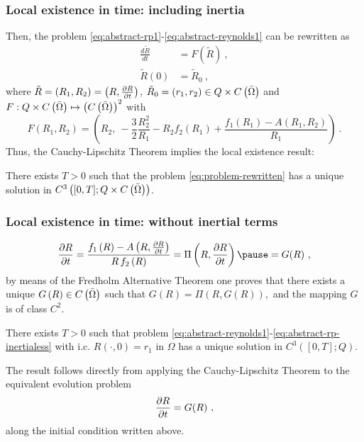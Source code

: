 \documentclass[10pt,aspectratio=169]{beamer}
\begin{document}
\begin{frame}\frametitle{Local existence in time: including inertia}
Then, the problem \eqref{eq:abstract-rp1}-\eqref{eq:abstract-reynolds1} can be rewritten as
\begin{equation}
\begin{split}
\frac{d\tilde{R}}{dt}&=F(\tilde{R})~,\\
\tilde{R}(0)&=\tilde{R}_0~,
\end{split}\label{eq:problem-rewritten}
\end{equation}
where $\tilde{R}=\left(R_1,R_2\right)=\left(R,\frac{\partial R}{\partial t}\right)$, $\tilde{R}_0=(r_1,r_2)\in Q\times C\left(\bar{\Omega}\right)$ and $F:Q\times C\left(\bar{\Omega}\right)\mapsto \left(C\left(\bar{\Omega}\right)\right)^2$ with
\begin{equation}
F(R_1,R_2)=\left(
R_2,~-\frac{3}{2}\frac{R_2^2}{R_1}-R_2f_2\left(R_1\right)+\frac{f_1\left(R_1\right)-A\left(R_1,R_2\right)}{R_1}\right)~.
\end{equation}
Thus, the Cauchy-Lipschitz Theorem implies the local existence result:
\begin{theorem}There exists $T>0$ such that the  problem \eqref{eq:problem-rewritten} has a unique solution in $C^3\left([0,T];Q\times C\left(\bar{\Omega}\right)\right)$.
\end{theorem}
\end{frame}

\begin{frame}
\frametitle{Local existence in time: without inertial terms}
\vspace*{0.6cm}
\begin{equation}
\parder{R}{t}=\frac{f_1\left(R\right)-A\left(R,\parder{R}{t}\right)}{R\,f_2\left(R\right)}=\Pi\left(R,\parder{R}{t}\right)\pause=G(R)~,\label{eq:abstract-rp-inertialess}
\end{equation}
by means of the Fredholm Alternative Theorem one proves that there exists a unique $G\left(R\right)\in C\left(\bar{\Omega}\right)$ such that $G\left(R\right)=\Pi\left(R,G\left(R\right)\right),$ and the mapping $G$ is of class $C^2$.
\begin{theorem}There exists $T>0$ such that  problem \eqref{eq:abstract-reynolds1}-\eqref{eq:abstract-rp-inertialess} with i.c. $R\left(\cdot,0\right)=r_1$ in $\Omega$ has a unique solution in $C^3\left([0,T];Q\right)$.
\end{theorem}
The result follows directly from applying the Cauchy-Lipschitz Theorem to the equivalent evolution problem
\begin{equation}
\frac{\partial R}{\partial t}=G(R)~,\label{eq:ev-problem-G}
\end{equation}
along the initial condition written above.
\end{frame} 
\end{document}
